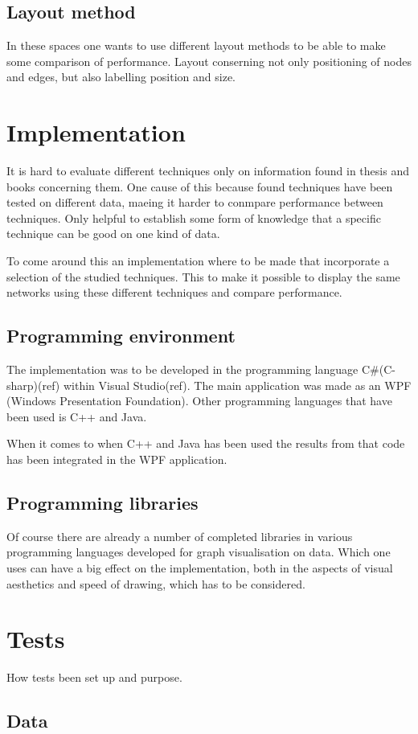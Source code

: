 \documentclass[a4paper,11pt]{kth-mag}
\begin{document}
\subsection{Layout method}
In these spaces one wants to use different layout methods to be able to make some comparison of performance. Layout conserning not only 
positioning of nodes and edges, but also labelling position and size. 

\section{Implementation}
It is hard to evaluate different techniques only on information found in thesis and books concerning them. 
One cause of this because found techniques have been tested on different data, maeing it harder to conmpare 
performance between techniques. Only helpful to establish some form of knowledge that a specific technique 
can be good on one kind of data.

To come around this an implementation where to be made that incorporate a selection of the studied techniques.
This to make it possible to display the same networks using these different techniques and compare performance.
\subsection{Programming environment}
The implementation was to be developed in the programming language C#(C-sharp)(ref) within Visual Studio(ref)\cite{website:VisualStudio}. 
The main application was made as an WPF (Windows Presentation Foundation). Other programming languages that have been used 
is C++ and Java.

When it comes to when C++ and Java has been used the results from that code has been integrated in the WPF application.
\subsection{Programming libraries}
Of course there are already a number of completed libraries in various programming languages developed for graph visualisation 
on data. Which one uses can have a big effect on the implementation, both in the aspects of visual aesthetics and speed of drawing,
which has to be considered.
\section{Tests}
\label{sec:tests}
How tests been set up and purpose.
\subsection{Data}
\end{document}
